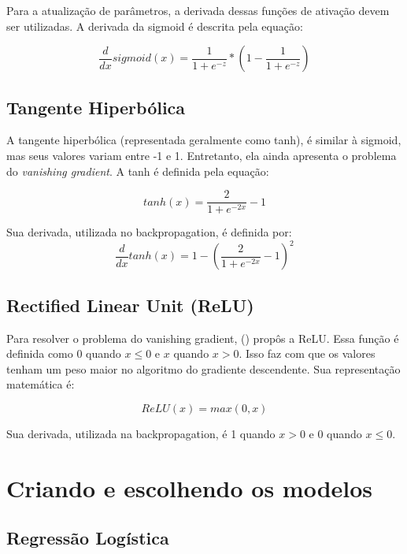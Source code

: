 \documentclass[conference]{IEEEtran}
\begin{document}
	Para a atualização de parâmetros, a derivada dessas funções de ativação devem ser utilizadas. A derivada da sigmoid é descrita pela equação:
	

\begin{equation}
\dfrac{d}{dx}sigmoid(x) = \dfrac{1}{1 + e^{-z}} * (1 - \dfrac{1}{1 + e^{-z}})
\end{equation}	

\subsection{Tangente Hiperbólica}
  
	A tangente hiperbólica (representada geralmente como tanh), é similar à sigmoid, mas seus valores variam entre -1 e 1. Entretanto, ela ainda apresenta o problema do \textit{vanishing gradient}. A tanh é definida pela equação:
  
\begin{equation}
tanh(x) = \dfrac{2}{1+e^{-2x}} - 1
\end{equation}

	Sua derivada, utilizada no backpropagation, é definida por:
\begin{equation}
\dfrac{d}{dx}tanh(x) =  1 - (\dfrac{2}{1+e^{-2x}} - 1)^2
\end{equation}	

\subsection{Rectified Linear Unit (ReLU)}

	Para resolver o problema do vanishing gradient, \citeauthor{nair2010rectified} (\citeyear{nair2010rectified}) propôs a ReLU. Essa função é definida como 0 quando $x	\leq 0$ e $x$ quando $x>0$. Isso faz com que os valores tenham um peso maior no algoritmo do gradiente descendente. Sua representação matemática é:
	
\begin{equation}
ReLU(x) =  max(0,x)
\end{equation}

	Sua derivada, utilizada na backpropagation, é 1 quando $x>0$ e 0 quando $x \leq 0$.
	
\section{Criando e escolhendo os modelos}

\subsection{Regressão Logística}
\end{document}
